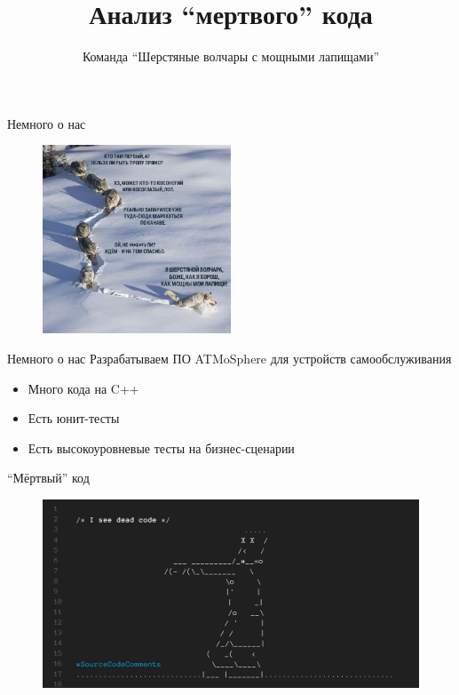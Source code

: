 \documentclass[aspectratio=169]{beamer}
\title{Анализ \enquote{мертвого} кода}
\author{Команда \enquote{Шерстяные волчары с мощными лапищами}}
\newcommand{\myskip}{\vspace{\baselineskip}}
\begin{document}
\begin{frame}
    \titlepage
\end{frame}

\begin{frame}{Немного о нас}
    \begin{figure}
        \includegraphics[width=0.5\textwidth]{memes/volf.jpg}
    \end{figure}
\end{frame}

\begin{frame}{Немного о нас}
    Разрабатываем ПО ATMoSphere для устройств самообслуживания
    \begin{itemize}
        \item Много кода на C++
        \item Есть юнит-тесты
        \item Есть высокоуровневые тесты на бизнес-сценарии
    \end{itemize}
    \myskip
\end{frame}

\begin{frame}{\enquote{Мёртвый} код}
    \begin{figure}
        \includegraphics[width=1.0\textwidth]{memes/dead_code.jpg}
    \end{figure}
\end{frame}
\end{document}
